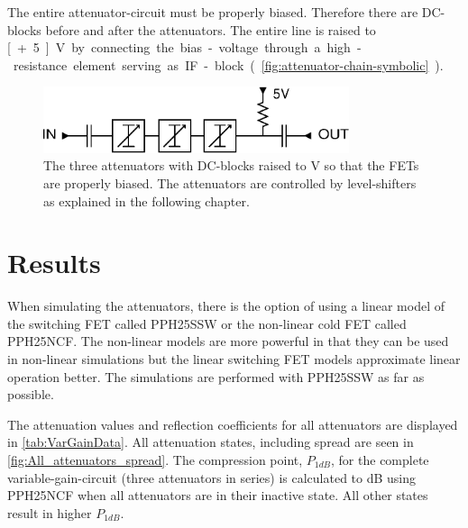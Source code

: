 
The entire attenuator-circuit must be properly biased. Therefore there are DC-blocks before and after the attenuators. The entire line is raised to \unit[+5]{V} by connecting the bias-voltage through a high-resistance element serving as IF-block (\autoref{fig:attenuator-chain-symbolic}).

		\begin{figure}[h!]
			\centering
			\includegraphics[width=0.8\textwidth]{fig/attenuators/attenuator-chain-symbolic}
			\caption[The attenuator-circuit schematically]{The three attenuators with DC-blocks raised to \unit[5]{V} so that the FETs are properly biased. The attenuators are controlled by level-shifters as explained in the following chapter.}\label{fig:attenuator-chain-symbolic}
		\end{figure}

	
	\section{Results}
		
		When simulating the attenuators, there is the option of using a linear model of the switching FET called PPH25SSW or the non-linear cold FET called PPH25NCF. The non-linear models are more powerful in that they can be used in non-linear simulations but the linear switching FET  models approximate linear operation better. The simulations are performed with PPH25SSW as far as possible.		
		
		The attenuation values and reflection coefficients for all attenuators are displayed in \autoref{tab:VarGainData}. All attenuation states, including spread are seen in \autoref{fig:All_attenuators_spread}. The compression point, $P_{1dB}$, for the complete variable-gain-circuit (three attenuators in series) is calculated to \unit[22]{dB} using PPH25NCF when all attenuators are in their inactive state. All other states result in higher $P_{1dB}$.
	
	
	
